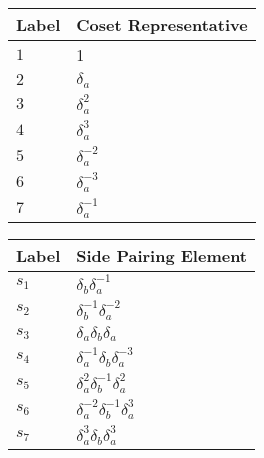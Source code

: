 \documentclass{article}
\begin{document}
\begin{center}
\begin{tabular}{ll}
\toprule
Label & Coset Representative\\
\midrule
$1$ & 1 \\
$2$ & $\delta_a^{}$ \\
$3$ & $\delta_a^{2}$ \\
$4$ & $\delta_a^{3}$ \\
$5$ & $\delta_a^{-2}$ \\
$6$ & $\delta_a^{-3}$ \\
$7$ & $\delta_a^{-1}$ \\
\bottomrule
\end{tabular}
\hfill
\begin{tabular}{ll}
\toprule
Label & Side Pairing Element\\
\midrule
$s_{1}$ & $\delta_b^{}\delta_a^{-1}$ \\
$s_{2}$ & $\delta_b^{-1}\delta_a^{-2}$ \\
$s_{3}$ & $\delta_a^{}\delta_b^{}\delta_a^{}$ \\
$s_{4}$ & $\delta_a^{-1}\delta_b^{}\delta_a^{-3}$ \\
$s_{5}$ & $\delta_a^{2}\delta_b^{-1}\delta_a^{2}$ \\
$s_{6}$ & $\delta_a^{-2}\delta_b^{-1}\delta_a^{3}$ \\
$s_{7}$ & $\delta_a^{3}\delta_b^{}\delta_a^{3}$ \\
\bottomrule
\end{tabular}
\end{center}

\thispagestyle{empty}
\end{document}
